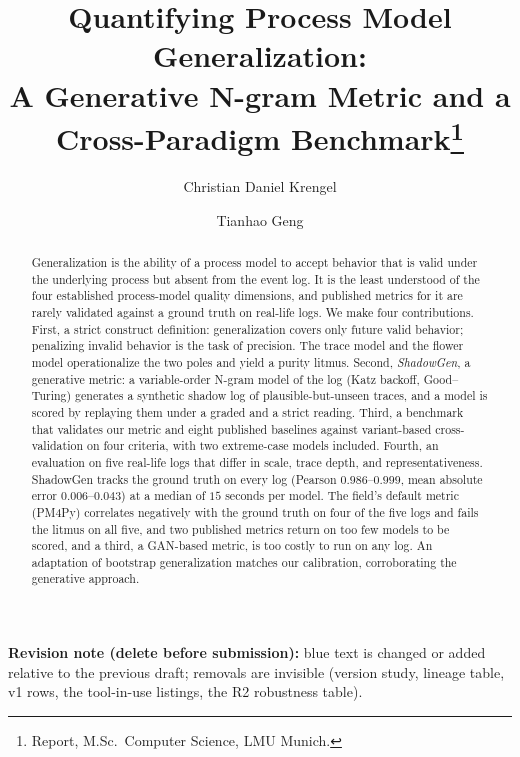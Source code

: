 \documentclass[runningheads]{llncs}
\newcommand{\chg}[1]{\textcolor{chgblue}{#1}}
\begin{document}
\title{Quantifying Process Model Generalization:\\
A Generative N-gram Metric and a Cross-Paradigm Benchmark\thanks{Report, M.Sc.\ Computer Science, LMU Munich.}}

\author{Christian Daniel Krengel \and Tianhao Geng}

\maketitle

{\color{chgblue}\noindent\footnotesize\textbf{Revision note (delete before submission):} blue text is changed or added relative to the previous draft; removals are invisible (version study, lineage table, v1 rows, the tool-in-use listings, the R2 robustness table).\par}\vspace{2mm}

\begin{abstract}
Generalization is the ability of a process model to accept behavior that is valid under the underlying process but absent from the event log. It is the least understood of the four established process-model quality dimensions, \chg{and published metrics for it are rarely validated against a ground truth on real-life logs. We make four contributions. First, a strict construct definition: generalization covers only future valid behavior; penalizing invalid behavior is the task of precision. The trace model and the flower model operationalize the two poles and yield a purity litmus. Second, \emph{ShadowGen}, a generative metric: a variable-order N-gram model of the log (Katz backoff, Good--Turing) generates a synthetic shadow log of plausible-but-unseen traces, and a model is scored by replaying them under a graded and a strict reading. Third, a benchmark that validates our metric and eight published baselines against variant-based cross-validation on four criteria, with two extreme-case models included. Fourth, an evaluation on five real-life logs that differ in scale, trace depth, and representativeness. ShadowGen tracks the ground truth on every log (Pearson $0.986$--$0.999$, mean absolute error $0.006$--$0.043$) at a median of $15$ seconds per model. The field's default metric (PM4Py) correlates negatively with the ground truth on four of the five logs and fails the litmus on all five, and two published metrics return on too few models to be scored, and a third, a GAN-based metric, is too costly to run on any log. An adaptation of bootstrap generalization matches our calibration, corroborating the generative approach.}

\end{abstract}
\end{document}
